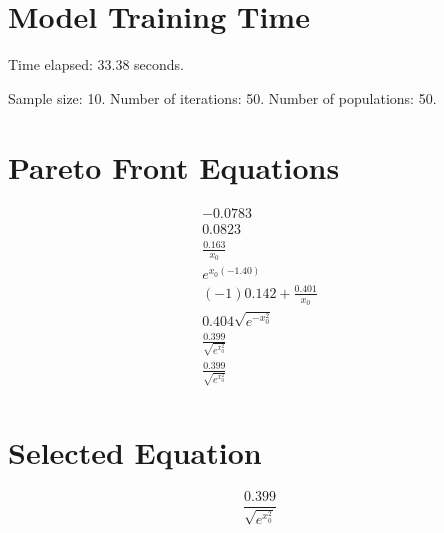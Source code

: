 \documentclass{article}
\begin{document}
\section*{Model Training Time}
Time elapsed: 33.38 seconds.

Sample size: 10.
Number of iterations: 50.
Number of populations: 50.

\section*{Pareto Front Equations}
\begin{align*}
-0.0783 \\
0.0823 \\
\frac{0.163}{x_{0}} \\
e^{x_{0} \left(-1.40\right)} \\
\left(-1\right) 0.142 + \frac{0.401}{x_{0}} \\
0.404 \sqrt{e^{- x_{0}^{2}}} \\
\frac{0.399}{\sqrt{e^{x_{0}^{2}}}} \\
\frac{0.399}{\sqrt{e^{x_{0}^{2}}}} \\
\end{align*}

\section*{Selected Equation}
\[ \frac{0.399}{\sqrt{e^{x_{0}^{2}}}} \]
\end{document}
